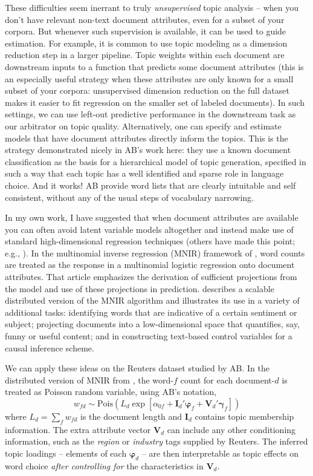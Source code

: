 \documentclass[12pt]{article}
\newcommand{\bs}[1]{\boldsymbol{#1}}
\newcommand{\mr}[1]{\mathrm{#1}}
\newcommand{\bm}[1]{\mathbf{#1}}
\begin{document}
These difficulties seem inerrant to truly {\it unsupervised} topic analysis -- when you don't have relevant non-text document attributes, even for a subset of your corpora.  But whenever such supervision is available, it can be used to guide estimation.  For example, it is common to use topic modeling as a dimension reduction step in a larger pipeline.  Topic weights within each document are downstream inputs to a function that predicts some document attributes (this is an especially useful strategy when these attributes are only known for a small subset of your corpora: unsupervised dimension reduction on the full dataset makes it easier to fit regression on the smaller set of labeled documents).  In such settings, we can use left-out predictive performance in the downstream task as our arbitrator on topic quality.  Alternatively, one can specify and estimate models that have document attributes directly inform the topics.  This is the strategy demonstrated nicely in AB's work here: they use a known document classification as the basis for a hierarchical model of topic generation, specified in such a way that each topic has a well identified and sparse role in language choice.  And it works! AB provide word lists that are clearly intuitable and self consistent, without any of the usual steps of vocabulary narrowing.

In my own work, I have suggested that when document attributes are available you can often avoid  latent variable models altogether and instead make use of standard high-dimensional regression techniques (others have made this point; e.g., \citealt{jia2014concise}).  In the multinomial inverse regression (MNIR) framework of \cite{taddy_multinomial_2013},  word counts  are treated as the response in a multinomial logistic regression onto document attributes.  That article emphasizes the derivation of sufficient  projections from the model and use of these projections in prediction.  \cite{taddy_distributed_2015} 
describes a scalable distributed version of the MNIR algorithm and illustrates its use in a variety of additional tasks: identifying words that are indicative of a certain sentiment or subject; projecting documents into a low-dimensional space that quantifies, say, funny or useful content; and in constructing text-based control variables for a causal inference scheme.

We can apply these ideas on the Reuters dataset studied by AB.  In the
distributed version of MNIR from \cite{taddy_distributed_2015}, the word-$f$
count for each document-$d$ is treated as Poisson random variable, using AB's notation, \begin{equation}\label{eq:taddyglm} w_{fd} \sim
\mr{Pois}\left( L_d \exp\left[ \alpha_{0f} + \bm{I}_d'\bs{\varphi}_f
+ \bm{V}_d'\bs{\gamma}_f\right]\right) \end{equation} where $L_d = \sum_f
w_{fd}$ is the document length and $\bm{I}_d$ contains topic membership
information.  The extra attribute vector $\bm{V}_d$ can include any other 
conditioning information, such as the {\it region} or {\it industry}
tags supplied by Reuters.  The inferred
topic loadings -- elements of each $\bs{\varphi}_d$ -- are then interpretable
as topic effects on word choice {\it after controlling for} the characteristics in $\bm{V}_d$.  
\end{document}
